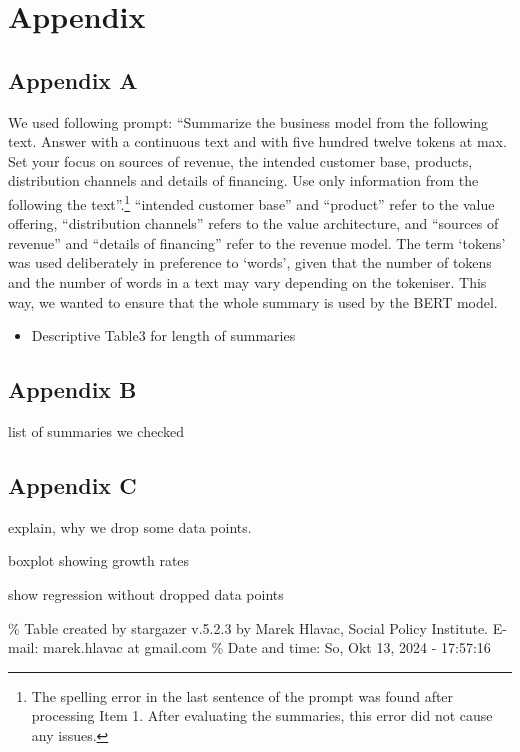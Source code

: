 \documentclass[
]{article}
\providecommand{\tightlist}{%
  \setlength{\itemsep}{0pt}\setlength{\parskip}{0pt}}\usepackage{longtable,booktabs,array}
\begin{document}
\newpage{}

\section{Appendix}\label{appendix}

\subsection{Appendix A}\label{appendix-a}

We used following prompt: ``Summarize the business model from the
following text. Answer with a continuous text and with five hundred
twelve tokens at max. Set your focus on sources of revenue, the intended
customer base, products, distribution channels and details of financing.
Use only information from the following the text''.\footnote{The
  spelling error in the last sentence of the prompt was found after
  processing Item 1. After evaluating the summaries, this error did not
  cause any issues.} ``intended customer base'' and ``product'' refer to
the value offering, ``distribution channels'' refers to the value
architecture, and ``sources of revenue'' and ``details of financing''
refer to the revenue model. The term `tokens' was used deliberately in
preference to `words', given that the number of tokens and the number of
words in a text may vary depending on the tokeniser. This way, we wanted
to ensure that the whole summary is used by the BERT model.

\begin{itemize}
\tightlist
\item
  Descriptive Table3 for length of summaries
\end{itemize}

\subsection{Appendix B}\label{appendix-b}

list of summaries we checked

\subsection{Appendix C}\label{appendix-c}

explain, why we drop some data points.

boxplot showing growth rates

show regression without dropped data points

\% Table created by stargazer v.5.2.3 by Marek Hlavac, Social Policy
Institute. E-mail: marek.hlavac at gmail.com \% Date and time: So, Okt
13, 2024 - 17:57:16
\end{document}
